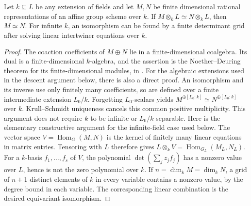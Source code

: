 \begin{lemma}
\label{C:NoetherDeuring_rational}
Let $k\subseteq L$ be any extension of fields and let $M,N$ be finite
dimensional rational representations of an affine group scheme over $k$.
If $M\otimes_kL\simeq N\otimes_kL$, then $M\simeq N$.
For infinite $k$, an isomorphism can be found by a finite determinant
grid after solving linear intertwiner equations over $k$.
\end{lemma}
\begin{proof}
The coaction coefficients of $M\oplus N$ lie in a finite-dimensional
coalgebra. Its dual is a finite-dimensional $k$-algebra, and the
assertion is the Noether--Deuring theorem for its finite-dimensional
modules, in \cite[Theorem 9.2.8]{C-Webb2016}.
For the algebraic extensions used in the descent argument below,
there is also a direct proof. An isomorphism and its inverse use
only finitely many coefficients, so are defined over a finite
intermediate extension $L_0/k$. Forgetting $L_0$-scalars yields
$M^{\oplus[L_0:k]}\simeq N^{\oplus[L_0:k]}$ over $k$.
Krull--Schmidt uniqueness cancels this common positive multiplicity.
This argument does not require $k$ to be infinite or $L_0/k$ separable.
Here is the elementary constructive argument for the infinite-field
case used below. The vector space $V=\operatorname{Hom}_G(M,N)$ is
the kernel of finitely many linear equations in matrix entries.
Tensoring with $L$ therefore gives
$L\otimes_k V=\operatorname{Hom}_{G_L}(M_L,N_L)$.
For a $k$-basis $f_1,\ldots,f_s$ of $V$, the polynomial
$\det(\sum_j z_jf_j)$ has a nonzero value over $L$, hence is not
the zero polynomial over $k$. If $n=\dim_k M=\dim_k N$, a grid
of $n+1$ distinct elements of $k$ in every variable contains a
nonzero value, by the degree bound in each variable. The corresponding
linear combination is the desired equivariant isomorphism.
\end{proof}

